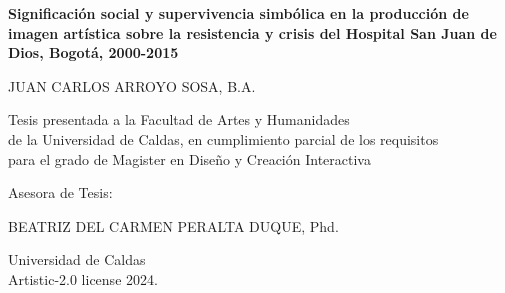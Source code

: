 \begin{titlepage}
\renewcommand*{\thepage}{Title}

    \begin{center} 
        \vspace*{3cm}
        
        {\fontsize{16pt}{22pt}\selectfont\textbf
            {Significación social y supervivencia simbólica en la producción de imagen artística sobre la resistencia y crisis del Hospital San Juan de Dios, Bogotá, 2000-2015}
        }


        
        \vspace{1.5cm}
        
        
        \vspace{0.5cm}
        
        	JUAN CARLOS ARROYO SOSA, B.A. \\

        \vspace{1.5cm}
        
        	Tesis presentada a la Facultad de Artes y Humanidades \\
            de la Universidad de Caldas, en cumplimiento parcial de los requisitos \\
            para el grado de Magister en Diseño y Creación Interactiva

        
        \vspace{2.5cm}
        
        Asesora de Tesis:\\

        \vspace{0.5cm}
        
        BEATRIZ DEL CARMEN PERALTA DUQUE, Phd.\\
        
        \vspace{3cm}
        
            Universidad de Caldas\\
            \vspace{0.5cm}
            Artistic-2.0 license 2024. 
    
    \end{center}

\end{titlepage}